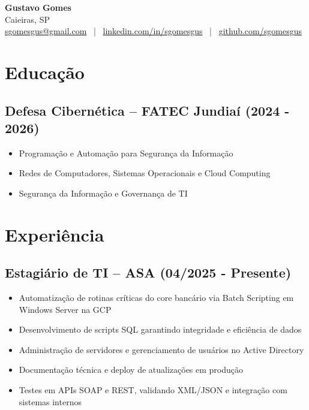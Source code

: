 \documentclass[a4paper,10pt]{article}
\begin{document}
\begin{center}
    {\LARGE \textbf{Gustavo Gomes}}\\[0.1cm]
    Caieiras, SP\\
    \href{mailto:sgomesgus@gmail.com}{sgomesgus@gmail.com} ~|~ 
    \href{https://www.linkedin.com/in/sgomesgus}{linkedin.com/in/sgomesgus} ~|~ 
    \href{https://github.com/sgomesgus}{github.com/sgomesgus}
\end{center}

\section{Educação}
\subsection{\textbf{Defesa Cibernética – FATEC Jundiaí (2024 - 2026)}}
\begin{itemize} 
    \item Programação e Automação para Segurança da Informação
    \item Redes de Computadores, Sistemas Operacionais e Cloud Computing
    \item Segurança da Informação e Governança de TI
\end{itemize}

\section{Experiência}

\subsection{\textbf{Estagiário de TI -- ASA (04/2025 - Presente)}}
\begin{itemize} 
    \item Automatização de rotinas críticas do core bancário via Batch Scripting em Windows Server na GCP
    \item Desenvolvimento de scripts SQL garantindo integridade e eficiência de dados
    \item Administração de servidores e gerenciamento de usuários no Active Directory
    \item Documentação técnica e deploy de atualizações em produção
    \item Testes em APIs SOAP e REST, validando XML/JSON e integração com sistemas internos
\end{itemize}
\end{document}
